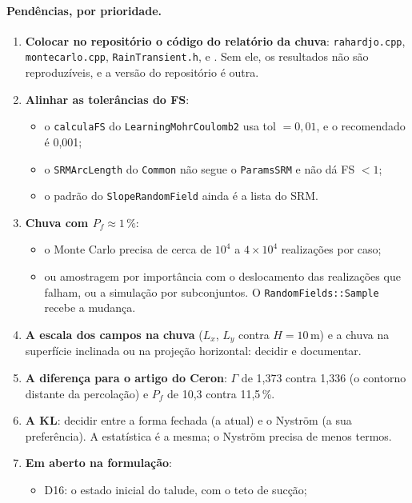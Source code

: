 \paragraph{Pendências, por prioridade.}
\begin{enumerate}
  \item \textbf{Colocar no repositório o código do relatório da chuva}: \texttt{rahardjo.cpp}, \texttt{montecarlo.cpp},
    \texttt{RainTransient.h},  e . Sem ele, os resultados não são
    reproduzíveis, e a versão do repositório é outra.
  \item \textbf{Alinhar as tolerâncias do FS}:
    \begin{itemize}
      \item o \texttt{calculaFS} do \texttt{LearningMohrCoulomb2} usa tol $= 0{,}01$, e o recomendado é 0,001;
      \item o \texttt{SRMArcLength} do \texttt{Common} não segue o \texttt{ParamsSRM} e não dá FS $< 1$;
      \item o padrão do \texttt{SlopeRandomField} ainda é a lista do SRM.
    \end{itemize}
  \item \textbf{Chuva com $P_f \approx 1\,\%$}:
    \begin{itemize}
      \item o Monte Carlo precisa de cerca de $10^4$ a $4\times10^4$ realizações por caso;
      \item ou amostragem por importância com o deslocamento das realizações que falham, ou a simulação por
        subconjuntos. O \texttt{RandomFields::Sample} recebe a mudança.
    \end{itemize}
  \item \textbf{A escala dos campos na chuva} ($L_x$, $L_y$ contra $H = 10$\,m) e a chuva na superfície inclinada ou na
    projeção horizontal: decidir e documentar.
  \item \textbf{A diferença para o artigo do Ceron}: $\Gamma$ de 1,373 contra 1,336 (o contorno distante da percolação)
    e $P_f$ de 10,3 contra 11,5\,\%.
  \item \textbf{A KL}: decidir entre a forma fechada (a atual) e o Nyström (a sua preferência). A estatística é a mesma;
    o Nyström precisa de menos termos.
  \item \textbf{Em aberto na formulação}:
    \begin{itemize}
      \item D16: o estado inicial do talude, com o teto de sucção;

\end{itemize}
\end{enumerate}
